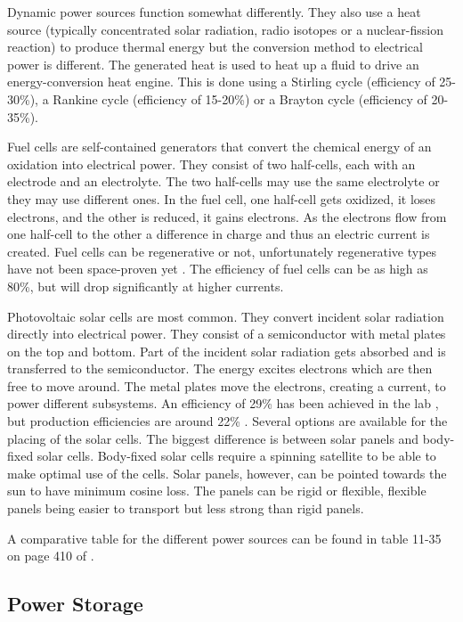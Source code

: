 Dynamic power sources function somewhat differently. They also use a heat source (typically concentrated solar radiation, radio isotopes or a nuclear-fission reaction) to produce thermal energy but the conversion method to electrical power is different. The generated heat is used to heat up a fluid to drive an energy-conversion heat engine. This is done using a Stirling cycle (efficiency of 25-30\%), a Rankine cycle (efficiency of 15-20\%) or a Brayton cycle (efficiency of 20-35\%).

Fuel cells are self-contained generators that convert the chemical energy of an oxidation into electrical power. They consist of two half-cells, each with an electrode and an electrolyte. The two half-cells may use the same electrolyte or they may use different ones.
In the fuel cell, one half-cell gets oxidized, it loses electrons, and the other is reduced, it gains electrons. As the electrons flow from
one half-cell to the other a difference in charge and thus an electric current is created. Fuel cells can be regenerative or not, unfortunately regenerative types have not been space-proven yet \cite{rees}.
The efficiency of fuel cells can be as high as 80\%, but will drop significantly at higher currents.

Photovoltaic solar cells are most common. They convert incident solar radiation directly into electrical power. They consist of a semiconductor with metal plates on the top and bottom. Part of the incident solar radiation gets absorbed and is transferred to the
semiconductor. The energy excites electrons which are then free to move around. The metal plates move the electrons, creating a current,
to power different subsystems. An efficiency of 29\% has been achieved in the lab \cite{doody1}, but production efficiencies are around 22\% \cite{larson}. Several options are available for the placing of the solar cells. The biggest difference is between solar panels and body-fixed solar cells. Body-fixed solar cells require a spinning satellite to be able to make optimal use of the cells. Solar panels, however, can be pointed towards the sun to have minimum cosine loss. The panels can be rigid or flexible, flexible panels being easier to transport but less strong than rigid panels.

A comparative table for the different power sources can be found in table 11-35 on page 410 of \cite{larson}.

\subsection{Power Storage}
\label{blDOstorage}


